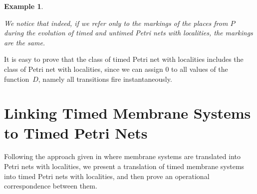 \documentclass{eptcs}
\newtheorem{example}{Example}
\begin{document}
\begin{example}
\begin{center}
\end{center}

\noindent We notice that indeed, if we refer only to the
markings of the places from $P$ during the evolution of timed and
untimed Petri nets with localities, the markings are the same.

\end{example}

It is easy to prove that the class of timed Petri net with
localities includes the class of Petri net with localities, since we
can assign $0$ to all values of the function~$D$, namely all
transitions fire instantaneously.

\section{Linking Timed Membrane Systems to Timed Petri Nets}
\label{subsection:relationship}

Following the approach given in \cite{Kleijn06} where membrane systems are
translated into Petri nets with localities, we present a translation of timed
membrane systems into timed Petri nets with localities, and then prove an
operational correspondence between them.
\end{document}
